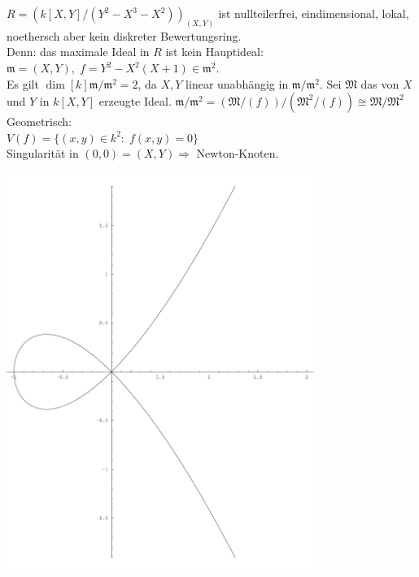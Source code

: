 \begin{nnBsp}
$R = (k[X,Y]/(Y^2-X^3-X^2))_{(X,Y)}$ ist nullteilerfrei, eindimensional, lokal, noethersch aber kein diskreter Bewertungsring.\\
Denn: das maximale Ideal in $R$ ist kein Hauptideal: $\mathfrak{m}=(X,Y), \; f = Y^2-X^2(X+1) \in \mathfrak{m}^2$.\\
Es gilt $\dim[k]{\mathfrak{m}/\mathfrak{m}^2} = 2$, da $X,Y$ linear unabhängig in $\mathfrak{m}/\mathfrak{m}^2$.
Sei $\mathfrak{M}$ das von $X$ und $Y$ in $k[X,Y]$ erzeugte Ideal.
$\mathfrak{m}/\mathfrak{m}^2 = (\mathfrak{M}/(f))/(\mathfrak{M}^2/(f)) \cong \mathfrak{M}/\mathfrak{M}^2$\\
Geometrisch:\\
$V(f) = \{(x,y) \in k^2: \; f(x,y) = 0\}$\\
Singularität in $(0,0) = (X,Y) \Rightarrow$ \glqq Newton-Knoten\grqq.
\begin{center}
	\includegraphics[width=0.75\textwidth]{images/algebra2/newtonknoten.pdf}
\end{center}
\end{nnBsp}
